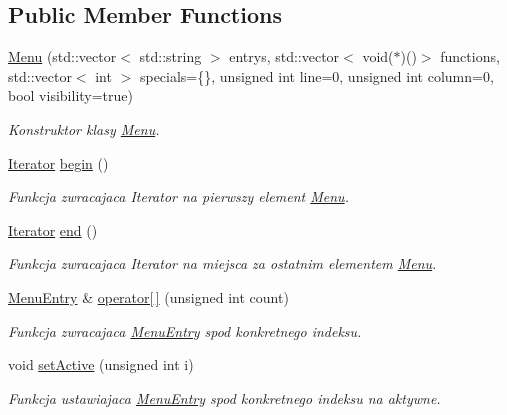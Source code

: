 \subsection*{Public Member Functions}
\begin{DoxyCompactItemize}
\item 
\hyperlink{class_menu_ad705e11e42f40448689344e9028b7dc6}{Menu} (std\+::vector$<$ std\+::string $>$ entrys, std\+::vector$<$ void($\ast$)()$>$ functions, std\+::vector$<$ int $>$ specials=\{\}, unsigned int line=0, unsigned int column=0, bool visibility=true)
\begin{DoxyCompactList}\small\item\em Konstruktor klasy \hyperlink{class_menu}{Menu}. \end{DoxyCompactList}\item 
\hyperlink{class_menu_aceaa934be18280340c221593bbee54d6}{Iterator} \hyperlink{class_menu_ad463178d6970e3db29a3d6289d72c5f0}{begin} ()
\begin{DoxyCompactList}\small\item\em Funkcja zwracajaca Iterator na pierwszy element \hyperlink{class_menu}{Menu}. \end{DoxyCompactList}\item 
\hyperlink{class_menu_aceaa934be18280340c221593bbee54d6}{Iterator} \hyperlink{class_menu_a17613d2e18e1b61105697bf20da2a202}{end} ()
\begin{DoxyCompactList}\small\item\em Funkcja zwracajaca Iterator na miejsca za ostatnim elementem \hyperlink{class_menu}{Menu}. \end{DoxyCompactList}\item 
\hyperlink{class_menu_entry}{Menu\+Entry} \& \hyperlink{class_menu_a4dc775abd74159477e8036f163f654c4}{operator\mbox{[}$\,$\mbox{]}} (unsigned int count)
\begin{DoxyCompactList}\small\item\em Funkcja zwracajaca \hyperlink{class_menu_entry}{Menu\+Entry} spod konkretnego indeksu. \end{DoxyCompactList}\item 
void \hyperlink{class_menu_a823da268994dc5e067f65e6e8101a07b}{set\+Active} (unsigned int i)
\begin{DoxyCompactList}\small\item\em Funkcja ustawiajaca \hyperlink{class_menu_entry}{Menu\+Entry} spod konkretnego indeksu na aktywne. \end{DoxyCompactList}\item 

\end{DoxyCompactItemize}
